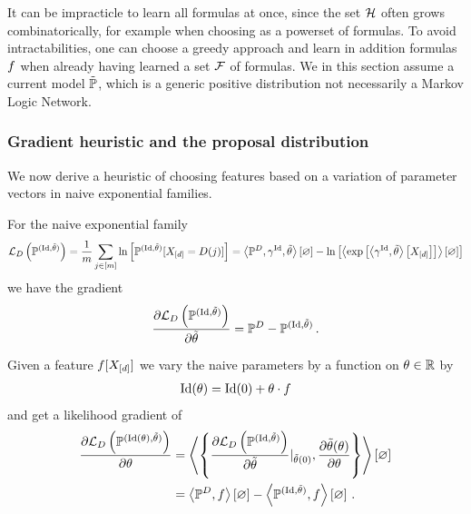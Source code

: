 It can be impracticle to learn all formulas at once, since the set $\mathcal{H}$ often grows combinatorically, for example when choosing as a powerset of formulas.
To avoid intractabilities, one can choose a greedy approach and learn in addition formulas $f$ when already having learned a set $\mathcal{F}$ of formulas.
We in this section assume a current model $\tilde{\mathbb{P}}$, which is a generic positive distribution not necessarily a Markov Logic Network. %




\subsubsection{Gradient heuristic and the proposal distribution}

We now derive a heuristic of choosing features based on a variation of parameter vectors in naive exponential families.

For the naive exponential family 
\begin{align*}
	\mathcal{L}_{D}\left(\mathbb{P}^{(\mathrm{Id}, \tilde{\theta})}\right) 
	= \frac{1}{m} \sum_{j\in[m]}\ln \left[ \mathbb{P}^{(\mathrm{Id}, \tilde{\theta})}[X_{[d]}=D(j)] \right]
	= \left\langle \mathbb{P}^{D}, \gamma^{\mathrm{Id}}, \tilde{\theta}\right\rangle \left[ \varnothing \right] - \ln \left[ \left\langle \mathrm{exp}\left[\left\langle \gamma^{\mathrm{Id}}, \tilde{\theta}\right\rangle \left[ X_{[d]} \right]\right]\right\rangle \left[ \varnothing \right] \right] 
\end{align*}
we have the gradient
\begin{align*}
	\frac{\partial \mathcal{L}_{D}\left(\mathbb{P}^{(\mathrm{Id}, \tilde{\theta})}\right)}{\partial\tilde{\theta}} 
	= \mathbb{P}^{D} - \mathbb{P}^{(\mathrm{Id}, \tilde{\theta})} \, . 
\end{align*}

Given a feature $f[X_{[d]}]$ we vary the naive parameters by a function on $\theta\in\mathbb{R}$ by
\begin{align*}
	 \naivestat(\canparam) %
	= \naivestat(0) + \canparam\cdot\exfunction
\end{align*}
and get a likelihood gradient of
\begin{align*}
	 \frac{\partial \mathcal{L}_{D}\left(\mathbb{P}^{(\mathrm{Id}(\theta), \tilde{\theta})}\right)}{\partial\theta} 
	 &= \left\langle \left\{
	 	\frac{\partial\mathcal{L}_{D}\left(\mathbb{P}^{(\mathrm{Id}, \tilde{\theta})}\right)}{\partial\tilde{\theta}}|_{\tilde{\theta}(0)},
		\frac{\partial\tilde{\theta}(\theta)}{\partial\theta} 
	 \right\}\right\rangle \left[ \varnothing \right]  \\
	 &= \left\langle \mathbb{P}^{D},f\right\rangle \left[ \varnothing \right] -   \left\langle \mathbb{P}^{(\mathrm{Id}, \tilde{\theta})},f\right\rangle \left[ \varnothing \right] \, .
\end{align*}


